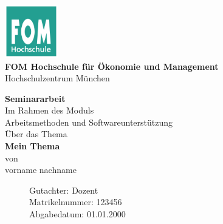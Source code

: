 \newcommand{\Thema}{Mein Thema}
\newcommand{\Name}{vorname nachname}
\newcommand{\Gutachter}{Dozent}
\newcommand{\Matrikelnummer}{123456}
\newcommand{\Abgabedatum}{01.01.2000}




\begin{titlepage}
	\begin{center}
		\includegraphics[width=2.3cm]{assets/fomLogo.pdf}\\
		\textbf{FOM Hochschule für Ökonomie und Management}\\
		\vspace{.5cm}
		Hochschulzentrum München
	\end{center}
																											
	\bigskip	
																												
	\begin{center}
		\textbf{Seminararbeit}\\
		\vspace{0.2cm}
		Im Rahmen des Moduls\\
		\vspace{0.5cm}
		Arbeitsmethoden und Softwareunterstützung\\
		\vspace{2cm}
		Über das Thema\\
		\vspace{0.5cm}
		\textbf{\Thema}\\
		\vspace{0.5cm}
		von\\
		\vspace{0.5cm}
		\Name\\
	\end{center}
																																												
	\begin{figure}[b]
																																																																																															                        
		Gutachter: \Gutachter       \\
		Matrikelnummer: \Matrikelnummer \\ 
		Abgabedatum: \Abgabedatum 
	\end{figure}
																																														
\end{titlepage}
